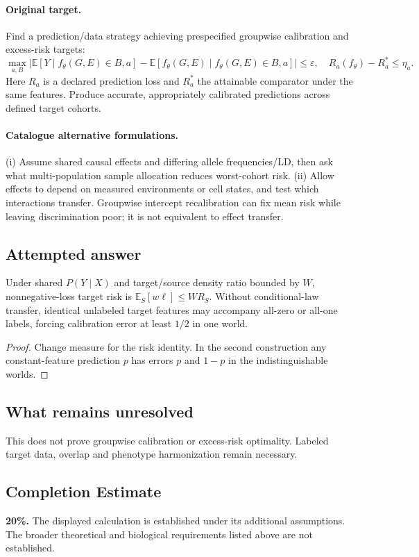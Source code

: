 \documentclass[11pt]{article}
\begin{document}
\paragraph{Original target.}
Find a prediction/data strategy achieving prespecified groupwise calibration and excess-risk targets:
\[
\max_{a,B}|\mathbb{E}[Y\mid f_\theta(G,E)\in B,a]-\mathbb{E}[f_\theta(G,E)\mid f_\theta(G,E)\in B,a]|\leq\varepsilon,
\quad R_a(f_\theta)-R_a^*\leq\eta_a.
\]
Here $R_a$ is a declared prediction loss and $R_a^*$ the attainable comparator under the same features. Produce accurate, appropriately calibrated predictions across defined target cohorts.
\paragraph{Catalogue alternative formulations.}
(i) Assume shared causal effects and differing allele frequencies/LD, then ask what multi-population sample allocation reduces worst-cohort risk. (ii) Allow effects to depend on measured environments or cell states, and test which interactions transfer. Groupwise intercept recalibration can fix mean risk while leaving discrimination poor; it is not equivalent to effect transfer.
\subsection{Attempted answer}
\begin{proposition}
Under shared $P(Y\mid X)$ and target/source density ratio bounded by $W$, nonnegative-loss target risk is $\mathbb{E}_S[w\ell]\leq WR_S$. Without conditional-law transfer, identical unlabeled target features may accompany all-zero or all-one labels, forcing calibration error at least $1/2$ in one world.
\end{proposition}
\begin{proof}
Change measure for the risk identity. In the second construction any constant-feature prediction $p$ has errors $p$ and $1-p$ in the indistinguishable worlds.
\end{proof}
\subsection{What remains unresolved}
This does not prove groupwise calibration or excess-risk optimality. Labeled target data, overlap and phenotype harmonization remain necessary.
\subsection{Completion Estimate}
\textbf{20\%.} The displayed calculation is established under its additional assumptions. The broader theoretical and biological requirements listed above are not established.
\end{document}
